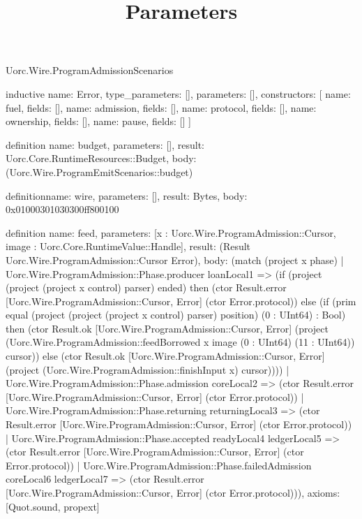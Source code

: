 \begin{lexlean}{Uorc.Wire.ProgramAdmissionScenarios}
\title{Parameters}
\begin{semanticmodule}
inductive{
  name: Error,
  type_parameters: [],
  parameters: [],
  constructors: [
    {name: fuel, fields: []},
    {name: admission, fields: []},
    {name: protocol, fields: []},
    {name: ownership, fields: []},
    {name: pause, fields: []}
  ]
}

definition{
  name: budget,
  parameters: [],
  result: Uorc.Core.RuntimeResources::Budget,
  body: (Uorc.Wire.ProgramEmitScenarios::budget)
}

definition{name: wire, parameters: [], result: Bytes, body: 0x01000301030300ff800100}

definition{
  name: feed,
  parameters: [x : Uorc.Wire.ProgramAdmission::Cursor, image : Uorc.Core.RuntimeValue::Handle],
  result: (Result Uorc.Wire.ProgramAdmission::Cursor Error),
  body: (match (project x phase)
    | Uorc.Wire.ProgramAdmission::Phase.producer loanLocal1 => (if (project (project (project x control) parser) ended) then (ctor Result.error [Uorc.Wire.ProgramAdmission::Cursor, Error] (ctor Error.protocol)) else (if (prim equal (project (project (project x control) parser) position) (0 : UInt64) : Bool) then (ctor Result.ok [Uorc.Wire.ProgramAdmission::Cursor, Error] (project (Uorc.Wire.ProgramAdmission::feedBorrowed x image (0 : UInt64) (11 : UInt64)) cursor)) else (ctor Result.ok [Uorc.Wire.ProgramAdmission::Cursor, Error] (project (Uorc.Wire.ProgramAdmission::finishInput x) cursor))))
    | Uorc.Wire.ProgramAdmission::Phase.admission coreLocal2 => (ctor Result.error [Uorc.Wire.ProgramAdmission::Cursor, Error] (ctor Error.protocol))
    | Uorc.Wire.ProgramAdmission::Phase.returning returningLocal3 => (ctor Result.error [Uorc.Wire.ProgramAdmission::Cursor, Error] (ctor Error.protocol))
    | Uorc.Wire.ProgramAdmission::Phase.accepted readyLocal4 ledgerLocal5 => (ctor Result.error [Uorc.Wire.ProgramAdmission::Cursor, Error] (ctor Error.protocol))
    | Uorc.Wire.ProgramAdmission::Phase.failedAdmission coreLocal6 ledgerLocal7 => (ctor Result.error [Uorc.Wire.ProgramAdmission::Cursor, Error] (ctor Error.protocol))),
  axioms: [Quot.sound, propext]
}


\end{semanticmodule}
\end{lexlean}

